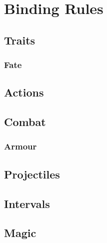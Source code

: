 \documentclass[a4paper,openany]{book}
\date{\today}
\begin{document}
\section*{Binding Rules}

\begin{multicols}{2}

\subsection*{Traits}





\subsubsection*{Fate}


\subsubsection*{}




\physicalSkillChart

\subsection*{Actions}








\subsection*{Combat}





\commonWeaponsChart

\subsubsection*{Armour}



\commonArmourChart

\mentalSkillChart

\subsection*{Projectiles}



\subsection*{Intervals}



\subsection*{Magic}



\end{multicols}
\end{document}

